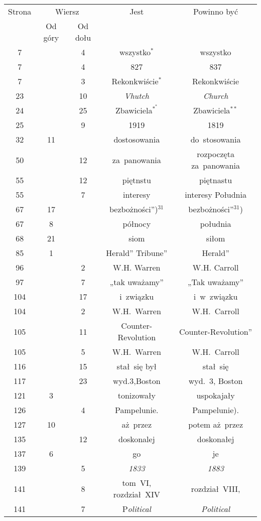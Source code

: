 \documentclass[a4paper,11pt]{article}
\begin{document}
\begin{center}

  \begin{tabular}{|c|c|c|c|c|}
    \hline
    Strona & \multicolumn{2}{c|}{Wiersz} & Jest
                              & Powinno być \\ \cline{2-3}
    & Od góry & Od dołu & & \\
    \hline
    7   & &  4 & wszystko$^{ * }$ & wszystko \\
    7   & &  4 & 827 & 837 \\
    7   & &  3 & Rekonkwiście$^{ * }$ & Rekonkwiście \\
    23  & & 10 & \textit{Vhutch} & \textit{Church} \\
    24  & & 25 & Zbawiciela$^{ *^{ * } }$ & Zbawiciela$^{ ** }$ \\
    25  & &  9 & 1919 & 1819 \\
    32  & 11 & & dostosowania & do~stosowania \\
    50  & & 12 & za~panowania & rozpoczęta za~panowania \\
    55  & & 12 & piętnstu & piętnastu \\
    55  & &  7 & interesy & interesy Południa \\
    67  & 17 & & bezbożności”)$^{ 31 }$ & bezbożności”$^{ 31 }$) \\
    67  &  8 & & północy & południa \\
    68  & 21 & & siom & siłom \\
    85  &  1 & & Herald” Tribune” & Herald” \\
    96  & &  2 & W.H. Warren & W.H. Carroll \\
    97  & &  7 & „tak uważamy” & „Tak uważamy” \\
    104 & & 17 & i~związku & i~w~związku \\
    104 & &  2 & W.H.~Warren & W.H.~Carroll \\
    105 & & 11 & Counter-Revolution & Counter-Revolution” \\
    105 & &  5 & W.H.~Warren & W.H.~Carroll \\
    116 & & 15 & stał~się był & stał~się \\
    117 & & 23 & wyd.3,Boston & wyd.~3, Boston \\
    121 &  3 & & tonizowały & uspokajały \\
    126 & &  4 & Pampelunie. & Pampelunie). \\
    127 & 10 & & aż~przez & potem aż~przez \\
    135 & & 12 & doskonalej & doskonałej \\
    137 &  6 & & go & je \\
    139 & &  5 & \textit{1833} & \textit{1883} \\
    141 & &  8 & tom~VI, rozdział~XIV & rozdział~VIII, \\
    141 & &  7 & P\textit{olitical} & \textit{Political} \\
    \hline
  \end{tabular}






\end{center}
\end{document}
